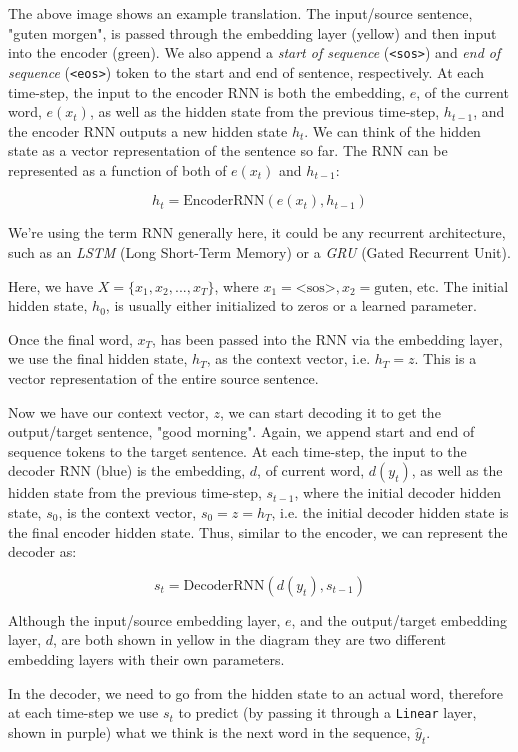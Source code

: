 \documentclass[11pt]{article}
\begin{document}
The above image shows an example translation. The input/source sentence,
"guten morgen", is passed through the embedding layer (yellow) and then
input into the encoder (green). We also append a \emph{start of
sequence} (\texttt{\textless{}sos\textgreater{}}) and \emph{end of
sequence} (\texttt{\textless{}eos\textgreater{}}) token to the start and
end of sentence, respectively. At each time-step, the input to the
encoder RNN is both the embedding, \(e\), of the current word,
\(e(x_t)\), as well as the hidden state from the previous time-step,
\(h_{t-1}\), and the encoder RNN outputs a new hidden state \(h_t\). We
can think of the hidden state as a vector representation of the sentence
so far. The RNN can be represented as a function of both of \(e(x_t)\)
and \(h_{t-1}\):

\[h_t = \text{EncoderRNN}(e(x_t), h_{t-1})\]

We're using the term RNN generally here, it could be any recurrent
architecture, such as an \emph{LSTM} (Long Short-Term Memory) or a
\emph{GRU} (Gated Recurrent Unit).

Here, we have \(X = \{x_1, x_2, ..., x_T\}\), where
\(x_1 = \text{<sos>}, x_2 = \text{guten}\), etc. The initial hidden
state, \(h_0\), is usually either initialized to zeros or a learned
parameter.

Once the final word, \(x_T\), has been passed into the RNN via the
embedding layer, we use the final hidden state, \(h_T\), as the context
vector, i.e. \(h_T = z\). This is a vector representation of the entire
source sentence.

Now we have our context vector, \(z\), we can start decoding it to get
the output/target sentence, "good morning". Again, we append start and
end of sequence tokens to the target sentence. At each time-step, the
input to the decoder RNN (blue) is the embedding, \(d\), of current
word, \(d(y_t)\), as well as the hidden state from the previous
time-step, \(s_{t-1}\), where the initial decoder hidden state, \(s_0\),
is the context vector, \(s_0 = z = h_T\), i.e. the initial decoder
hidden state is the final encoder hidden state. Thus, similar to the
encoder, we can represent the decoder as:

\[s_t = \text{DecoderRNN}(d(y_t), s_{t-1})\]

Although the input/source embedding layer, \(e\), and the output/target
embedding layer, \(d\), are both shown in yellow in the diagram they are
two different embedding layers with their own parameters.

In the decoder, we need to go from the hidden state to an actual word,
therefore at each time-step we use \(s_t\) to predict (by passing it
through a \texttt{Linear} layer, shown in purple) what we think is the
next word in the sequence, \(\hat{y}_t\).
\end{document}
